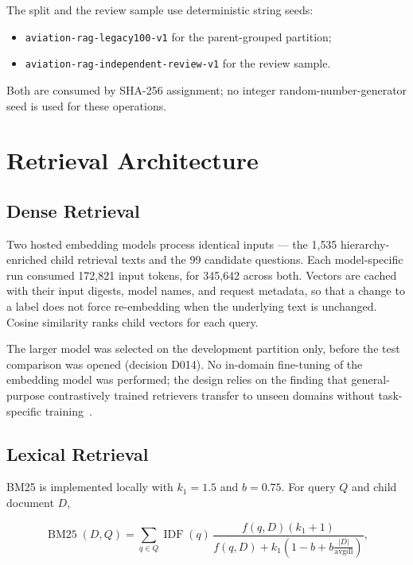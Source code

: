 The split and the review sample use deterministic string seeds:

\begin{itemize}
  \item \texttt{aviation-rag-legacy100-v1} for the parent-grouped partition;
  \item \texttt{aviation-rag-independent-review-v1} for the review sample.
\end{itemize}

\noindent Both are consumed by SHA-256 assignment; no integer random-number-generator seed is used for these operations.

\section{Retrieval Architecture}
\label{sec:method-retrieval}

\subsection{Dense Retrieval}

Two hosted embedding models process identical inputs --- the 1{,}535 hierarchy-enriched child retrieval texts and the 99 candidate questions. Each model-specific run consumed 172{,}821 input tokens, for 345{,}642 across both. Vectors are cached with their input digests, model names, and request metadata, so that a change to a label does not force re-embedding when the underlying text is unchanged. Cosine similarity ranks child vectors for each query.

The larger model was selected on the development partition only, before the test comparison was opened (decision D014). No in-domain fine-tuning of the embedding model was performed; the design relies on the finding that general-purpose contrastively trained retrievers transfer to unseen domains without task-specific training~\cite{izacard2022contriever}.

\subsection{Lexical Retrieval}

BM25 is implemented locally with $k_1=1.5$ and $b=0.75$. For query $Q$ and child document $D$,

\begin{equation}
\operatorname{BM25}(D,Q) =
\sum_{q \in Q}
\operatorname{IDF}(q)\,
\frac{f(q,D)(k_1+1)}
     {f(q,D)+k_1\left(1-b+b\frac{|D|}{\operatorname{avgdl}}\right)},
\label{eq:bm25}
\end{equation}

